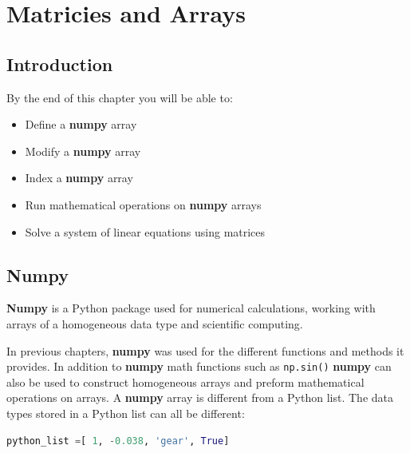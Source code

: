 \documentclass{book}
\begin{document}
    
        \chapter{Matricies and Arrays}\label{matricies-and-arrays}
    




    
        \section{Introduction}\label{introduction}
    




    
        By the end of this chapter you will be able to:

\begin{itemize}
\item
  Define a \textbf{numpy} array
\item
  Modify a \textbf{numpy} array
\item
  Index a \textbf{numpy} array
\item
  Run mathematical operations on \textbf{numpy} arrays
\item
  Solve a system of linear equations using matrices
\end{itemize}
    




    
        \section{Numpy}\label{numpy}
    




    
        \textbf{Numpy} is a Python package used for numerical calculations,
working with arrays of a homogeneous data type and scientific computing.

In previous chapters, \textbf{numpy} was used for the different
functions and methods it provides. In addition to \textbf{numpy} math
functions such as \lstinline!np.sin()! \textbf{numpy} can also be used
to construct homogeneous arrays and preform mathematical operations on
arrays. A \textbf{numpy} array is different from a Python list. The data
types stored in a Python list can all be different:

\begin{lstlisting}[language=Python]
python_list =[ 1, -0.038, 'gear', True]
\end{lstlisting}
\end{document}

